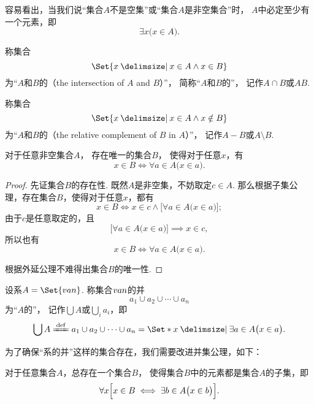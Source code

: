 容易看出，当我们说“集合\(A\)不是空集”或“集合\(A\)是非空集合”时，
\(A\)中必定至少有一个元素，即\[
	\exists x \bigl( x \in A \bigr).
\]


\begin{definition}
称集合\[
\Set{ x \given x \in A \land x \in B }
\]为“\(A\)和\(B\)的（the intersection of \(A\) and \(B\)）”，%
简称“\(A\)和\(B\)的”，%
记作\(A \cap B\)或\(AB\).
\end{definition}

\begin{definition}
称集合\[
\Set{ x \given x \in A \land x \notin B }
\]为“\(A\)和\(B\)的（the relative complement of \(B\) in \(A\)）”，%
记作\(A - B\)或\(A \setminus B\).
\end{definition}

\begin{theorem}\label{theorem:集合论.系的交的唯一存在性}
对于任意非空集合\(A\)，%
存在唯一的集合\(B\)，%
使得对于任意\(x\)，有\[
	x \in B
	\iff
	\forall a \in A \bigl( x \in a \bigr).
\]
\begin{proof}
先证集合\(B\)的存在性.
既然\(A\)是非空集，不妨取定\(c \in A\).
那么根据子集公理，存在集合\(B\)，使得对于任意\(x\)，都有\[
	x \in B
	\iff x \in c \land \bigl[ \forall a \in A \bigl( x \in a \bigr) \bigr];
\]
由于\(c\)是任意取定的，且\[
	\bigl[ \forall a \in A \bigl( x \in a \bigr) \bigr]
	\implies
	x \in c,
\]
所以也有\[
	x \in B
	\iff \forall a \in A \bigl( x \in a \bigr).
\]

根据外延公理不难得出集合\(B\)的唯一性.
\end{proof}
\end{theorem}

\begin{definition}
设系\(A = \Set{\v{a}{n}}\).
称集合\(v{a}{n}\)的并\[
	a_1 \cup a_2 \cup \dotsb \cup a_n
\]为“\(A\)的”，
记作\(\bigcup A\)或\(\bigcup\limits_i a_i\)，即\[
	\bigcup A
	\defeq
	a_1 \cup a_2 \cup \dotsb \cup a_n
	= \Set*{ x \given \exists a \in A \bigl( x \in a \bigr) }.
\]
\end{definition}

为了确保“系的并”这样的集合存在，我们需要改进并集公理，如下：
\begin{axiom}[并集公理II]
对于任意集合\(A\)，总存在一个集合\(B\)，%
使得集合\(B\)中的元素都是集合\(A\)的子集，即\[
	\forall x \Bigl[
		x \in B
		\iff
		\exists b \in A \bigl( x \in b \bigr)
	\Bigr].
\]
\end{axiom}

